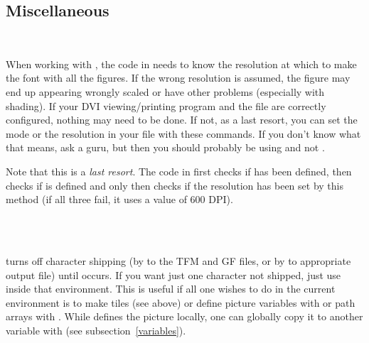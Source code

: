 \documentclass[letterpaper]{article}
\begin{document}
\subsection{Miscellaneous}\label{misc}

\begin{cd}
\\
%
\end{cd}

When working with \MF{}, the code in  needs to know
the resolution at which to make the font with all the figures. If the
wrong resolution is assumed, the figure may end up appearing wrongly
scaled or have other problems (especially with shading). If your DVI
viewing/printing program and the file  are correctly
configured, nothing may need to be done. If not, as a last resort, you
can set the \MF{} mode or the \MF{} resolution in your  file
with these commands. If you don't know what that means, ask a guru, but
then you should probably be using \MP{} and not \MF{}.

Note that this is a \emph{last resort}. The code in 
first checks if  has been defined, then checks if
 is defined and only then checks if the resolution has
been set by this method (if all three fail, it uses a value of 600 DPI).

\begin{cd}
\\%
\\%
%
%
%
\end{cd}

 turns off character shipping (by \MF{} to the TFM and
GF files, or by \MP{} to appropriate \EPS{} output file) until
 occurs. If you want just one character not shipped,
just use  inside that  environment. This is useful
if all one wishes to do in the current  environment is to
make tiles (see above) or define picture variables with  or
path arrays with . While  defines the picture
locally, one can globally copy it to another variable with
 (see subsection~\ref{variables}).

\begin{cd}
\\
\\
\\
%
%
%
%
%
\end{cd}
\end{document}
